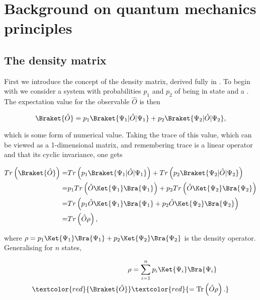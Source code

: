 \section{Background on quantum mechanics principles}
 \subsection{The density matrix}
 First we introduce the concept of the density matrix, derived fully in \cite{quantum_course}. To begin with we consider a system with probabilities $p_1$ and $p_2$ of being in state \psiOne and a \psiTwo. The expectation value for the observable $\hat{O}$ is then

\begin{equation}
\Braket{\hat{O}} = p_1\Braket{\Psi_1|\hat{O}|\Psi_1} + p_2\Braket{\Psi_2|\hat{O}|\Psi_2}, 
\end{equation}

\noindent which is some form of numerical value. Taking the trace of this value, which can be viewed as a 1-dimensional matrix, and remembering trace is a linear operator and that its cyclic invariance, one gets

\begin{equation}
\begin{aligned} 
Tr\left( \Braket{\hat{O}}\right)  = & Tr\left( p_1\Braket{\Psi_1|\hat{O}|\Psi_1}\right)  + Tr\left( p_2\Braket{\Psi_2|\hat{O}|\Psi_2}\right)  \\
= & p_1Tr\left( \hat{O}\Ket{\Psi_1}\Bra{\Psi_1}\right)  + p_2Tr\left( \hat{O}\Ket{\Psi_2}\Bra{\Psi_2}\right) \\
= & Tr\left(p_1\hat{O}\Ket{\Psi_1}\Bra{\Psi_1} + p_2 \hat{O}\Ket{\Psi_2}\Bra{\Psi_2}\right) \\
= & Tr\left( \hat{O}\rho \right),
\end{aligned}
\end{equation}

\noindent where $\rho = p_1\Ket{\Psi_1}\Bra{\Psi_1} + p_2\Ket{\Psi_2}\Bra{\Psi_2}$ is the density operator. Generalising for $n$ states,

\textcolor{red}{\begin{equation}
	\begin{aligned}
	\rho & = \sum_{i=1}^{n} p_i\Ket{\Psi_i}\Bra{\Psi_i}\\
	\textcolor{red}{\Braket{\hat{O}}} &  \textcolor{red}{= \text{Tr}\left( \hat{O}\rho\right).} 
	\end{aligned}
	\label{eqn:rawDensity}
	\end{equation}}

